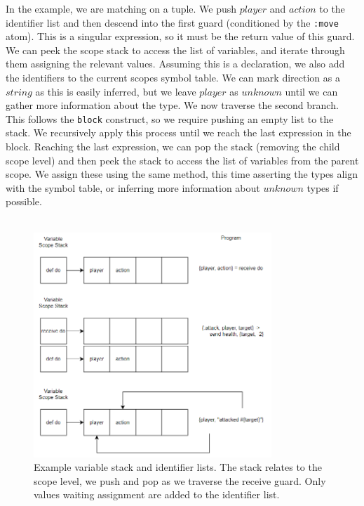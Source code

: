 In the example, we are matching on a tuple. We push $player$ and $action$ to the identifier list and then descend into the first guard (conditioned by the \texttt{:move} atom). This is a singular expression, so it must be the return value of this guard. We can peek the scope stack to access the list of variables, and iterate through them assigning the relevant values. Assuming this is a declaration, we also add the identifiers to the current scopes symbol table. We can mark direction as a $string$ as this is easily inferred, but we leave $player$ as $unknown$ until we can gather more information about the type. We now traverse the second branch. This follows the \texttt{block} construct, so we require pushing an empty list to the stack. We recursively apply this process until we reach the last expression in the block. Reaching the last expression, we can pop the stack (removing the child scope level) and then peek the stack to access the list of variables from the parent scope. We assign these using the same method, this time asserting the types align with the symbol table, or inferring more information about $unknown$ types if possible. \\ \\
\begin{figure}[h]
    \centering
    \includegraphics[width=0.8\textwidth]{images/var_stack.png}
    \caption{Example variable stack and identifier lists. The stack relates to the scope level, we push and pop as we traverse the receive guard. Only values waiting assignment are added to the identifier list.}
    \label{fig:scope_hierarchy2}
\end{figure}
